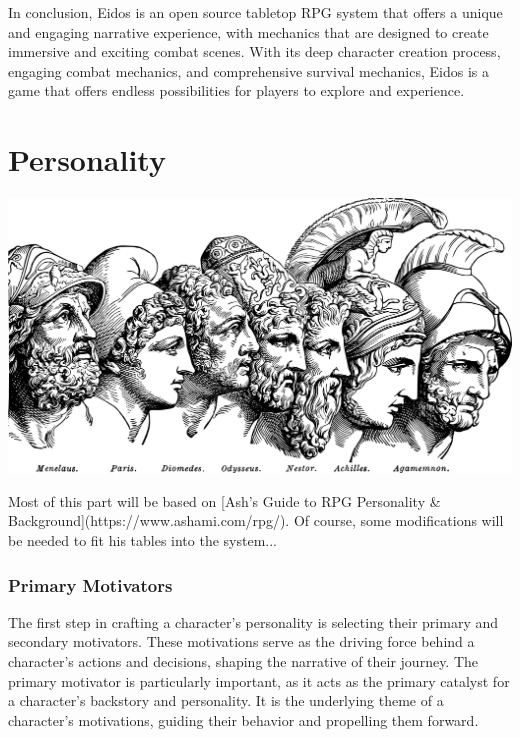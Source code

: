 \documentclass[12pt]{book}
\begin{document}
In conclusion, Eidos is an open source tabletop RPG system that offers a unique and engaging narrative experience, with mechanics that are designed to create immersive and exciting combat scenes. With its deep character creation process, engaging combat mechanics, and comprehensive survival mechanics, Eidos is a game that offers endless possibilities for players to explore and experience.


\chapter{Personality}

\begin{center}
    \includegraphics[width=\textwidth]{./images/personality01.pdf}
\end{center}

Most of this part will be based on [Ash’s Guide to RPG Personality \& Background](https://www.ashami.com/rpg/). Of course, some modifications will be needed to fit his tables into the system...

\subsection{\textbf{Primary Motivators}}

The first step in crafting a character's personality is selecting their primary and secondary motivators. These motivations serve as the driving force behind a character's actions and decisions, shaping the narrative of their journey. The primary motivator is particularly important, as it acts as the primary catalyst for a character's backstory and personality. It is the underlying theme of a character's motivations, guiding their behavior and propelling them forward.
\end{document}
